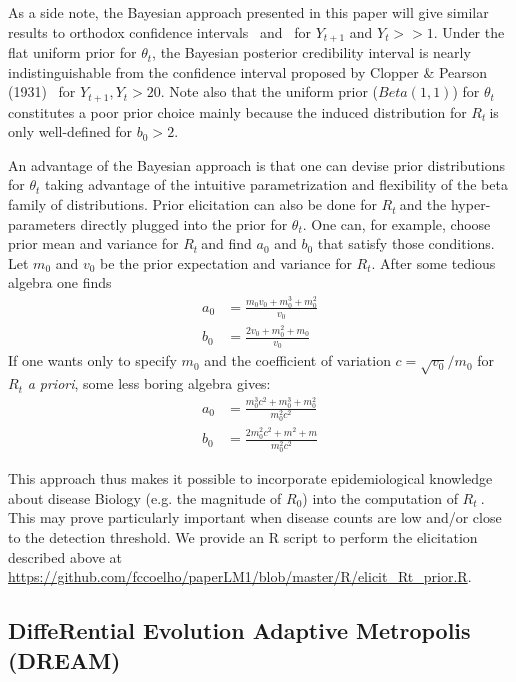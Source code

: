 \documentclass[10pt]{article}
\def \rr {$R_{t}\:$}
\begin{document}
As a side note, the Bayesian approach presented in this 
paper will give similar results to orthodox confidence intervals~\citep{wilson} 
and~\citep{clopper} for $Y_{t+1}$ and $Y_t >> 1$.
Under the flat  uniform prior for $\theta_t$, the Bayesian posterior 
credibility 
interval is nearly indistinguishable from the confidence interval proposed by 
Clopper \& Pearson (1931)~\citep{clopper} for $Y_{t+1}, Y_t > 20$.
Note also that the uniform prior ($Beta(1, 1)$) for $\theta_t$ constitutes a 
poor 
prior 
choice mainly because the induced distribution for \rr is only well-defined for 
$b_0 > 2$.

An advantage of the Bayesian approach is that one can devise prior 
distributions for $\theta_t$ taking advantage of the intuitive parametrization 
and flexibility of the beta family of distributions.
Prior elicitation can also be done for \rr and the hyper-parameters directly 
plugged into the prior for $\theta_t$. 
One can, for example, choose prior mean and variance for \rr and find $a_0$ 
and $b_0$ that satisfy those conditions.
Let $m_0$ and $v_0$ be the prior expectation and variance for $R_t$. 
After some tedious algebra one finds
\begin{align}
\label{seq:elicitation}
a_0 &= \frac{m_0v_0 + m_0^3 + m_0^2}{v_0} \\
b_0 &= \frac{2v_0 + m_0^2 + m_0}{v_0}
\end{align}
If one wants only to specify $m_0$ and the coefficient of variation $c = 
\sqrt{v_0}/ m_0$ for $R_t$ \textit{a priori}, some less boring 
algebra gives:
\begin{align}
\label{seq:elicitationcv}
a_0 &= \frac{m_0^3c^2 + m_0^3 + m_0^2}{m_0^2c^2} \\
b_0 &= \frac{2m_0^2c^2 + m^2 + m}{m_0^2c^2}
\end{align}

This approach thus makes it possible to incorporate epidemiological knowledge 
about disease Biology (e.g. the magnitude of $R_0$) into the computation of \rr.
This may prove particularly important when disease counts are low and/or close 
to the detection threshold.
We provide an R script to perform the elicitation described above at 
\url{https://github.com/fccoelho/paperLM1/blob/master/R/elicit_Rt_prior.R}.

\subsection*{DiffeRential Evolution Adaptive Metropolis (DREAM)}
\end{document}
